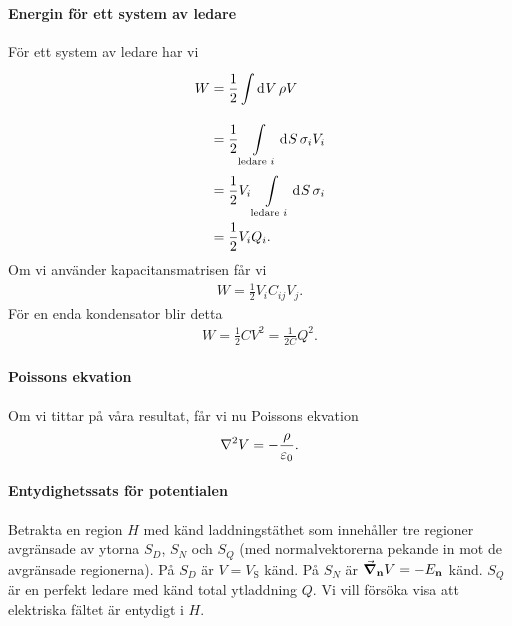 \paragraph{Energin för ett system av ledare}
För ett system av ledare har vi
\begin{align*}
	W &= \frac{1}{2}\int\limits_{}^{}\dd[]{V}\rho V \\
	  &= \frac{1}{2}\int\limits_{\text{ledare }i}^{}\dd[]{S}\sigma_{i}V_{i} \\
	  &= \frac{1}{2}V_{i}\int\limits_{\text{ledare }i}^{}\dd[]{S}\sigma_{i} \\
	  &= \frac{1}{2}V_{i}Q_{i}.
\end{align*}
Om vi använder kapacitansmatrisen får vi
\begin{align*}
	W = \frac{1}{2}V_{i}C_{ij}V_{j}.
\end{align*}
För en enda kondensator blir detta
\begin{align*}
	W = \frac{1}{2}CV^{2} = \frac{1}{2C}Q^{2}.
\end{align*}

\paragraph{Poissons ekvation}
Om vi tittar på våra resultat, får vi nu Poissons ekvation
\begin{align*}
	\laplacian{V} = -\frac{\rho}{\varepsilon_{0}}.
\end{align*}

\paragraph{Entydighetssats för potentialen}
Betrakta en region $H$ med känd laddningstäthet som innehåller tre regioner avgränsade av ytorna $S_{D}$, $S_{N}$ och $S_{Q}$ (med normalvektorerna pekande in mot de avgränsade regionerna). På $S_{D}$ är $V = V_{\text{S}}$ känd. På $S_{N}$ är $\grad_{\vb{n}}{V} = -E_{\vb{n}}$ känd. $S_{Q}$ är en perfekt ledare med känd total ytladdning $Q$. Vi vill försöka visa att elektriska fältet är entydigt i $H$.

